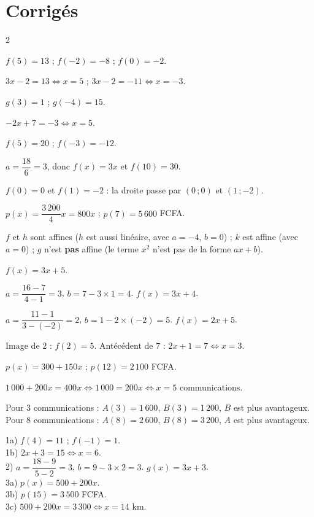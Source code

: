 \section{Corrigés}
\begin{multicols}{2}

$f(5)=13$ ; $f(-2)=-8$ ; $f(0)=-2$.

$3x-2=13\iff x=5$ ; $3x-2=-11\iff x=-3$.

$g(3)=1$ ; $g(-4)=15$.

$-2x+7=-3\iff x=5$.

$f(5)=20$ ; $f(-3)=-12$.

$a=\dfrac{18}6=3$, donc $f(x)=3x$ et $f(10)=30$.

$f(0)=0$ et $f(1)=-2$ : la droite passe par $(0\,;0)$ et $(1\,;-2)$.

$p(x)=\dfrac{3\,200}4x=800x$ ; $p(7)=5\,600$ FCFA.

$f$ et $h$ sont affines ($h$ est aussi linéaire, avec $a=-4$, $b=0$) ; $k$ est affine (avec
$a=0$) ; $g$ n'est \textbf{pas} affine (le terme $x^{2}$ n'est pas de la forme $ax+b$).

$f(x)=3x+5$.

$a=\dfrac{16-7}{4-1}=3$, $b=7-3\times1=4$. $f(x)=3x+4$.

$a=\dfrac{11-1}{3-(-2)}=2$, $b=1-2\times(-2)=5$. $f(x)=2x+5$.

Image de $2$ : $f(2)=5$. Antécédent de $7$ : $2x+1=7\iff x=3$.

$p(x)=300+150x$ ; $p(12)=2\,100$ FCFA.

$1\,000+200x=400x\iff1\,000=200x\iff x=5$ communications.

Pour $3$ communications : $A(3)=1\,600$, $B(3)=1\,200$, $B$ est plus avantageux. Pour $8$
communications : $A(8)=2\,600$, $B(8)=3\,200$, $A$ est plus avantageux.

1a) $f(4)=11$ ; $f(-1)=1$.\\
1b) $2x+3=15\iff x=6$.\\
2) $a=\dfrac{18-9}{5-2}=3$, $b=9-3\times2=3$. $g(x)=3x+3$.\\
3a) $p(x)=500+200x$.\\
3b) $p(15)=3\,500$ FCFA.\\
3c) $500+200x=3\,300\iff x=14$ km.


\end{multicols}
